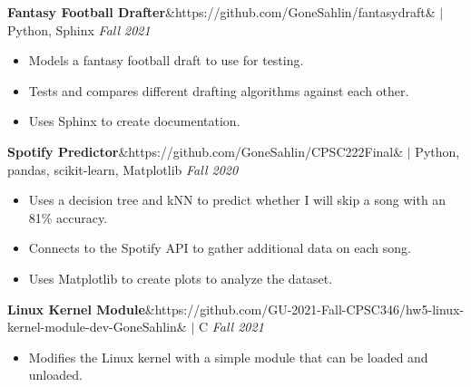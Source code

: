 \documentclass[11pt, a4paper, roman]{moderncv}
\newcommand{\project}[5]{
	\textbf{#1}\ifx&#2&{}
	\else
    		\href{#2}{\:\small\faGithub\:}\fi$|$ #3
	\hfill\textit{#4}
	#5
	\vspace{2mm}
}
\begin{document}
{\project{Fantasy Football Drafter}{https://github.com/GoneSahlin/fantasydraft}{Python, Sphinx}{Fall 2021}
	{\begin{itemize}
		\item Models a fantasy football draft to use for testing.
		\item Tests and compares different drafting algorithms against each other.
		\item Uses Sphinx to create documentation.
	\end{itemize}}
}
{\project{Spotify Predictor}{https://github.com/GoneSahlin/CPSC222Final}{Python, pandas, scikit-learn, Matplotlib}{Fall 2020}
	{\begin{itemize}
    		\item Uses a decision tree and kNN to predict whether I will skip a song with an 81\% accuracy.
    		\item Connects to the Spotify API to gather additional data on each song.
   		 \item Uses Matplotlib to create plots to analyze the dataset.
	\end{itemize}}
}
{\project{Linux Kernel Module}{https://github.com/GU-2021-Fall-CPSC346/hw5-linux-kernel-module-dev-GoneSahlin}{C}{Fall 2021}
	{\begin{itemize}
   		\item Modifies the Linux kernel with a simple module that can be loaded and unloaded.
	\end{itemize}}
}
\end{document}
